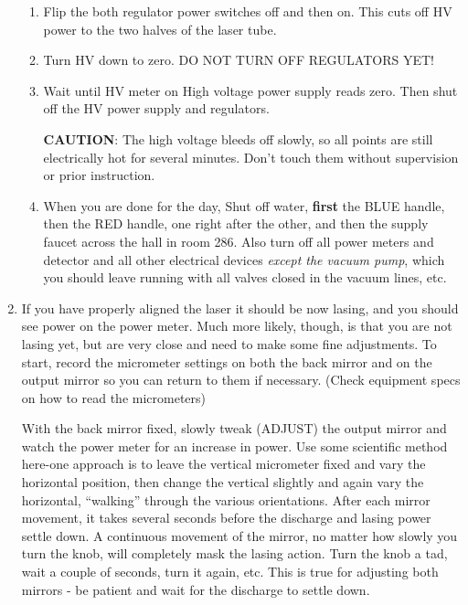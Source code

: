 \documentclass{../lab}
\begin{document}
\begin{enumerate}
    \begin{enumerate}
        \item Flip the both regulator power switches off and then on. This cuts off HV power to the two halves of the laser tube.
    
        \item Turn HV down to zero. DO NOT TURN OFF REGULATORS YET!
        
        \item Wait until HV meter on High voltage power supply reads zero. Then shut off the HV power supply and regulators.
        
        \textbf{CAUTION}: The high voltage bleeds off slowly, so all points are still electrically hot for several minutes. Don't touch them without supervision or prior instruction.
        
        \item When you are done for the day, Shut off water, \textbf{first} the BLUE handle, then the RED handle, one right after the other, and then the supply faucet across the hall in room 286. Also turn off all power meters and detector and all other electrical devices \emph{except the vacuum pump}, which you should leave running with all valves closed in the vacuum lines, etc.
    \end{enumerate}
    
    \item If you have properly aligned the laser it should be now lasing, and you should see power on the power meter. Much more likely, though, is that you are not lasing yet, but are very close and need to make some fine adjustments. To start, record the micrometer settings on both the back mirror and on the output mirror so you can return to them if necessary. (Check equipment specs on how to read the micrometers)
    
    With the back mirror fixed, slowly tweak (ADJUST) the output mirror and watch the power meter for an increase in power. Use some scientific method here-one approach is to leave the vertical micrometer fixed and vary the horizontal position, then change the vertical slightly and again vary the horizontal, ``walking'' through the various orientations. After each mirror movement, it takes several seconds before the discharge and lasing power settle down. A continuous movement of the mirror, no matter how slowly you turn the knob, will completely mask the lasing action. Turn the knob a tad, wait a couple of seconds, turn it again, etc. This is true for adjusting both mirrors - be patient and wait for the discharge to settle down.
    

\end{enumerate}
\end{document}
